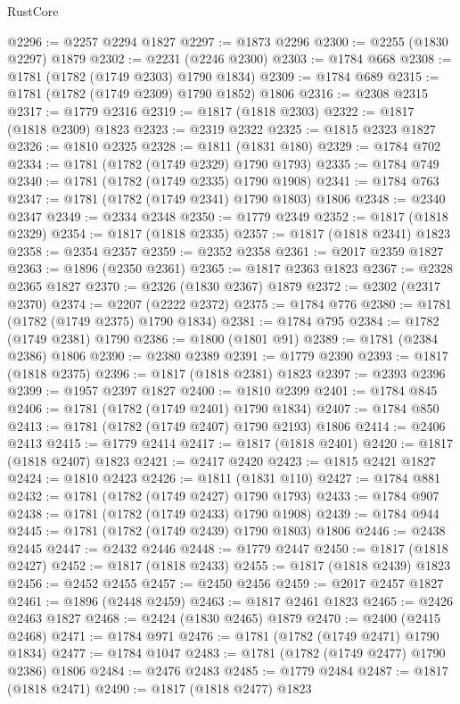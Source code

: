 \begin{lexlean}{RustCore}
\begin{coremodule}
@2296 := @2257 @2294 @1827
@2297 := @1873 @2296
@2300 := @2255 (@1830 @2297) @1879
@2302 := @2231 (@2246 @2300)
@2303 := @1784 @668
@2308 := @1781 (@1782 (@1749 @2303) @1790 @1834)
@2309 := @1784 @689
@2315 := @1781 (@1782 (@1749 @2309) @1790 @1852) @1806
@2316 := @2308 @2315
@2317 := @1779 @2316
@2319 := @1817 (@1818 @2303)
@2322 := @1817 (@1818 @2309) @1823
@2323 := @2319 @2322
@2325 := @1815 @2323 @1827
@2326 := @1810 @2325
@2328 := @1811 (@1831 @180)
@2329 := @1784 @702
@2334 := @1781 (@1782 (@1749 @2329) @1790 @1793)
@2335 := @1784 @749
@2340 := @1781 (@1782 (@1749 @2335) @1790 @1908)
@2341 := @1784 @763
@2347 := @1781 (@1782 (@1749 @2341) @1790 @1803) @1806
@2348 := @2340 @2347
@2349 := @2334 @2348
@2350 := @1779 @2349
@2352 := @1817 (@1818 @2329)
@2354 := @1817 (@1818 @2335)
@2357 := @1817 (@1818 @2341) @1823
@2358 := @2354 @2357
@2359 := @2352 @2358
@2361 := @2017 @2359 @1827
@2363 := @1896 (@2350 @2361)
@2365 := @1817 @2363 @1823
@2367 := @2328 @2365 @1827
@2370 := @2326 (@1830 @2367) @1879
@2372 := @2302 (@2317 @2370)
@2374 := @2207 (@2222 @2372)
@2375 := @1784 @776
@2380 := @1781 (@1782 (@1749 @2375) @1790 @1834)
@2381 := @1784 @795
@2384 := @1782 (@1749 @2381) @1790
@2386 := @1800 (@1801 @91)
@2389 := @1781 (@2384 @2386) @1806
@2390 := @2380 @2389
@2391 := @1779 @2390
@2393 := @1817 (@1818 @2375)
@2396 := @1817 (@1818 @2381) @1823
@2397 := @2393 @2396
@2399 := @1957 @2397 @1827
@2400 := @1810 @2399
@2401 := @1784 @845
@2406 := @1781 (@1782 (@1749 @2401) @1790 @1834)
@2407 := @1784 @850
@2413 := @1781 (@1782 (@1749 @2407) @1790 @2193) @1806
@2414 := @2406 @2413
@2415 := @1779 @2414
@2417 := @1817 (@1818 @2401)
@2420 := @1817 (@1818 @2407) @1823
@2421 := @2417 @2420
@2423 := @1815 @2421 @1827
@2424 := @1810 @2423
@2426 := @1811 (@1831 @110)
@2427 := @1784 @881
@2432 := @1781 (@1782 (@1749 @2427) @1790 @1793)
@2433 := @1784 @907
@2438 := @1781 (@1782 (@1749 @2433) @1790 @1908)
@2439 := @1784 @944
@2445 := @1781 (@1782 (@1749 @2439) @1790 @1803) @1806
@2446 := @2438 @2445
@2447 := @2432 @2446
@2448 := @1779 @2447
@2450 := @1817 (@1818 @2427)
@2452 := @1817 (@1818 @2433)
@2455 := @1817 (@1818 @2439) @1823
@2456 := @2452 @2455
@2457 := @2450 @2456
@2459 := @2017 @2457 @1827
@2461 := @1896 (@2448 @2459)
@2463 := @1817 @2461 @1823
@2465 := @2426 @2463 @1827
@2468 := @2424 (@1830 @2465) @1879
@2470 := @2400 (@2415 @2468)
@2471 := @1784 @971
@2476 := @1781 (@1782 (@1749 @2471) @1790 @1834)
@2477 := @1784 @1047
@2483 := @1781 (@1782 (@1749 @2477) @1790 @2386) @1806
@2484 := @2476 @2483
@2485 := @1779 @2484
@2487 := @1817 (@1818 @2471)
@2490 := @1817 (@1818 @2477) @1823

\end{coremodule}
\end{lexlean}
